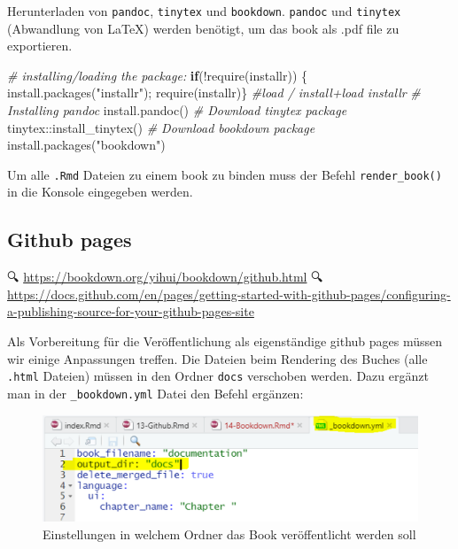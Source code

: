 \documentclass[
]{article}
\newenvironment{Shaded}{\begin{snugshade}}{\end{snugshade}}
\newcommand{\CommentTok}[1]{\textcolor[rgb]{0.56,0.35,0.01}{\textit{#1}}}
\newcommand{\ControlFlowTok}[1]{\textcolor[rgb]{0.13,0.29,0.53}{\textbf{#1}}}
\newcommand{\FunctionTok}[1]{\textcolor[rgb]{0.00,0.00,0.00}{#1}}
\newcommand{\NormalTok}[1]{#1}
\newcommand{\SpecialCharTok}[1]{\textcolor[rgb]{0.00,0.00,0.00}{#1}}
\newcommand{\StringTok}[1]{\textcolor[rgb]{0.31,0.60,0.02}{#1}}
\begin{document}
Herunterladen von \texttt{pandoc}, \texttt{tinytex} und \texttt{bookdown}. \texttt{pandoc} und \texttt{tinytex} (Abwandlung von LaTeX) werden benötigt, um das book als .pdf file zu exportieren.

\begin{Shaded}
\begin{Highlighting}[]
\CommentTok{\# installing/loading the package:}
\ControlFlowTok{if}\NormalTok{(}\SpecialCharTok{!}\FunctionTok{require}\NormalTok{(installr)) \{ }\FunctionTok{install.packages}\NormalTok{(}\StringTok{"installr"}\NormalTok{); }\FunctionTok{require}\NormalTok{(installr)\} }\CommentTok{\#load / install+load installr}
\CommentTok{\# Installing pandoc}
\FunctionTok{install.pandoc}\NormalTok{()}
\CommentTok{\# Download tinytex package}
\NormalTok{tinytex}\SpecialCharTok{::}\FunctionTok{install\_tinytex}\NormalTok{()}
\CommentTok{\# Download bookdown package}
\FunctionTok{install.packages}\NormalTok{(}\StringTok{"bookdown"}\NormalTok{)}
\end{Highlighting}
\end{Shaded}

Um alle \texttt{.Rmd} Dateien zu einem book zu binden muss der Befehl \texttt{render\_book()} in die Konsole eingegeben werden.

\hypertarget{github-pages}{%
\subsection{Github pages}\label{github-pages}}

🔍 \url{https://bookdown.org/yihui/bookdown/github.html}
🔍 \url{https://docs.github.com/en/pages/getting-started-with-github-pages/configuring-a-publishing-source-for-your-github-pages-site}

Als Vorbereitung für die Veröffentlichung als eigenständige github pages müssen wir einige Anpassungen treffen. Die Dateien beim Rendering des Buches (alle \texttt{.html} Dateien) müssen in den Ordner \texttt{docs} verschoben werden. Dazu ergänzt man in der \texttt{\_bookdown.yml} Datei den Befehl ergänzen:

\begin{figure}

{\centering \includegraphics[width=1\linewidth]{images/073} 

}

\caption{Einstellungen in welchem Ordner das Book veröffentlicht werden soll}\label{fig:unnamed-chunk-308}
\end{figure}
\end{document}

